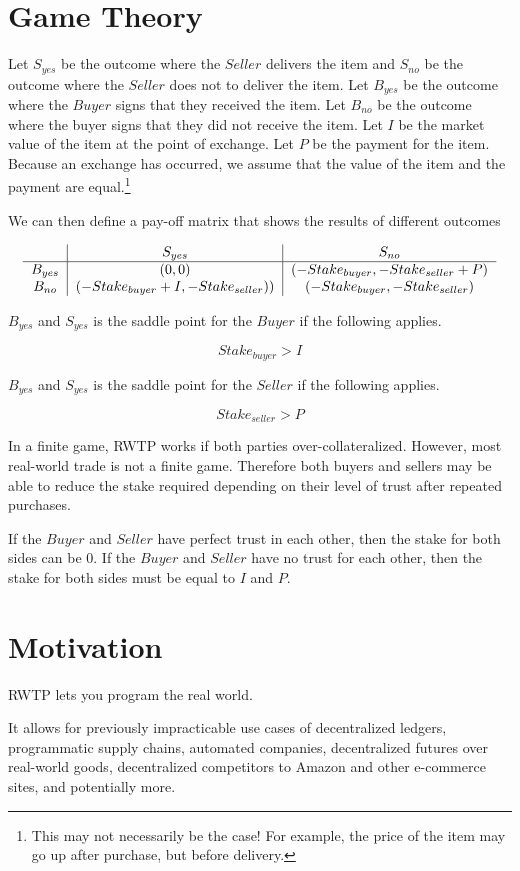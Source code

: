 \documentclass{article}
\begin{document}
\section{Game Theory}

Let $S_{yes}$ be the outcome where the $Seller$ delivers the item and $S_{no}$ be the outcome where the $Seller$ does not to deliver the item. Let $B_{yes}$ be the outcome where the $Buyer$ signs that they received the item. Let $B_{no}$ be the outcome where the buyer signs that they did not receive the item. Let $I$ be the market value of the item at the point of exchange. Let $P$ be the payment for the item. Because an exchange has occurred, we assume that the value of the item and the payment are equal.\footnote{This may not necessarily be the case! For example, the price of the item may go up after purchase, but before delivery.}

We can then define a pay-off matrix that shows the results of different outcomes

\begin{equation}
\begin{tabular}{  c | c | c  }
       & $S_{yes}$ & $S_{no}$ \\
       \hline
 $B_{yes}$ & $(0, 0)$ & $(-Stake_{buyer}, -Stake_{seller}+P)$ \\ 
 $B_{no}$ & $(-Stake_{buyer}+I, -Stake_{seller}))$ & $(-Stake_{buyer}, -Stake_{seller})$ \\  
\end{tabular}
\end{equation}

$B_{yes}$ and $S_{yes}$ is the saddle point for the $Buyer$ if the following applies.

\begin{equation}
    Stake_{buyer} > I
\end{equation}

$B_{yes}$ and $S_{yes}$ is the saddle point for the $Seller$ if the following applies.

\begin{equation}
    Stake_{seller} > P
\end{equation}

In a finite game, RWTP works if both parties over-collateralized. However, most real-world trade is not a finite game. Therefore both buyers and sellers may be able to reduce the stake required depending on their level of trust after repeated purchases. 

If the $Buyer$ and $Seller$ have perfect trust in each other, then the stake for both sides can be 0. If the $Buyer$ and $Seller$ have no trust for each other, then the stake for both sides must be equal to $I$ and $P$.

\section{Motivation}

RWTP lets you program the real world. 

It allows for previously impracticable use cases of decentralized ledgers, programmatic supply chains, automated companies, decentralized futures over real-world goods, decentralized competitors to Amazon and other e-commerce sites, and potentially more.
\end{document}

